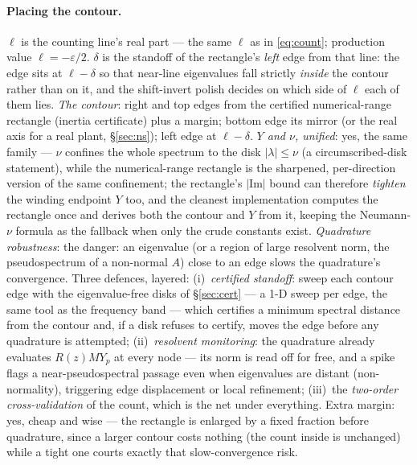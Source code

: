 \documentclass[11pt,a4paper]{article}
\newcommand{\eps}{\varepsilon}
\begin{document}
{\paragraph{Placing the contour.}
\emph{$\ell$} is the counting line's real part --- the same $\ell$ as in
\eqref{eq:count}; production value $\ell=-\eps/2$.  \emph{$\delta$} is the standoff of
the rectangle's \emph{left} edge from that line: the edge sits at $\ell-\delta$ so that
near-line eigenvalues fall strictly \emph{inside} the contour rather than on it, and the
shift-invert polish decides on which side of $\ell$ each of them lies.  \emph{The
contour}: right and top edges from the certified numerical-range rectangle (inertia
certificate) plus a margin; bottom edge its mirror (or the real axis for a real plant,
\S\ref{sec:ns}); left edge at $\ell-\delta$.  \emph{$Y$ and $\nu$, unified}: yes, the
same family --- $\nu$ confines the whole spectrum to the disk $|\lambda|\le\nu$ (a
circumscribed-disk statement), while the numerical-range rectangle is the sharpened,
per-direction version of the same confinement; the rectangle's $|\mathrm{Im}|$ bound can
therefore \emph{tighten} the winding endpoint $Y$ too, and the cleanest implementation
computes the rectangle once and derives both the contour and $Y$ from it, keeping the
Neumann-$\nu$ formula as the fallback when only the crude constants exist.
\emph{Quadrature robustness}: the danger: an eigenvalue (or a
region of large resolvent norm, the pseudospectrum of a non-normal $A$) close to an edge
slows the quadrature's convergence.  Three defences, layered: (i)~\emph{certified
standoff}: sweep each contour edge with the eigenvalue-free disks of \S\ref{sec:cert}
--- a 1-D sweep per edge, the same tool as the frequency band --- which certifies a
minimum spectral distance from the contour and, if a disk refuses to certify, moves the
edge before any quadrature is attempted; (ii)~\emph{resolvent monitoring}: the quadrature
already evaluates $R(z)MY_{\!p}$ at every node --- its norm is read off for free, and a
spike flags a near-pseudospectral passage even when eigenvalues are distant
(non-normality), triggering edge displacement or local refinement; (iii)~the
\emph{two-order cross-validation} of the count, which is the net under everything.
Extra margin: yes, cheap and wise --- the rectangle is enlarged by a fixed fraction
before quadrature, since a larger contour costs nothing (the count inside is unchanged)
while a tight one courts exactly that slow-convergence risk.


}
\end{document}
